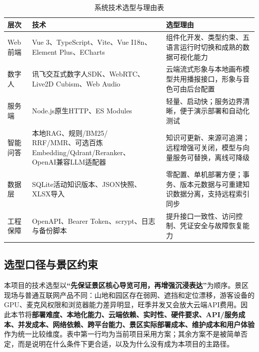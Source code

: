 \begin{table}[H]
  \centering
  \caption{系统技术选型与理由表}\label{tab:tech-stack}
  \begin{tabularx}{\textwidth}{>{\raggedright\arraybackslash}p{}>{\raggedright\arraybackslash}p{}>{\raggedright\arraybackslash}X}
    \toprule
    层次 & 技术 & 选型理由 \\
    \midrule
    Web前端 & Vue 3、TypeScript、Vite、Vue I18n、Element Plus、ECharts & 组件化开发、类型约束、五语言运行时切换和成熟的数据可视化能力 \\
    \midrule
    数字人 & 讯飞交互式数字人SDK、WebRTC、Live2D Cubism、Web Audio & 云端流式形象与本地画布模型共用播报接口，形象与音色可由后台配置 \\
    \midrule
    服务端 & Node.js原生HTTP、ES Modules & 轻量、启动快；服务边界清晰，便于演示部署和自动化测试 \\
    \midrule
    智能问答 & \makecell[l]{本地RAG、规则/BM25/\\RRF/MMR、可选百炼\\Embedding/Qdrant/Reranker、\\OpenAI兼容LLM适配器} & 知识可更新、来源可追溯；远程增强可关闭，模型与向量服务可替换，离线可降级 \\
    \midrule
    数据层 & SQLite活动知识版本、JSON快照、XLSX导入 & 零配置、单机部署方便；事务、版本元数据与可重建知识数据分离，支持远程索引同步 \\
    \midrule
    工程保障 & OpenAPI、Bearer Token、scrypt、日志与备份脚本 & 提升接口一致性、访问控制、凭证安全与故障恢复能力 \\
    \bottomrule
  \end{tabularx}
\end{table}

\subsection{选型口径与景区约束}

本项目的技术选型以\textbf{“先保证景区核心导览可用，再增强沉浸表达”}为顺序。景区现场与普通互联网产品不同：山地和园区存在弱网、遮挡和定位漂移，游客设备的GPU、麦克风权限和浏览器能力差异明显，旺季并发又会放大云端API费用。因此本节将\textbf{部署难度、本地化能力、云端依赖、实时性、硬件要求、API/服务成本、并发成本、网络依赖、跨平台能力、景区实际部署成本、维护成本和用户体验}作为统一比较维度。表中第一行均为当前项目采用方案；其余方案不是被简单否定，而是说明在什么条件下更合适，以及为什么没有成为本项目的主路径。

